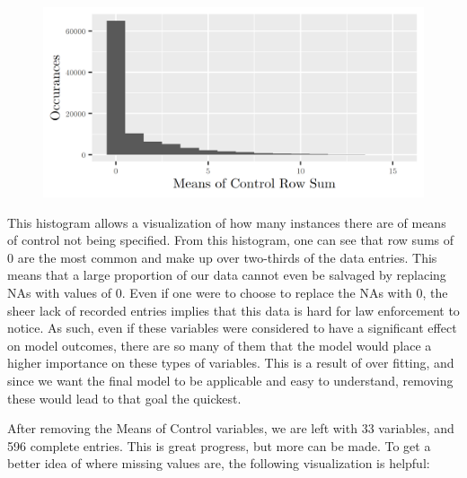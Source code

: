 \documentclass{article} %
\begin{document}
	\begin{figure}[H]
		\includegraphics[width = \textwidth]{MeansOfControlSumHist}
	\end{figure}
	
	This histogram allows a visualization of how many instances there are of means of control not being specified. From this histogram, one can see that row sums of 0 are the most common and make up over two-thirds of the data entries. This means that a large proportion of our data cannot even be salvaged by replacing NAs with values of 0. Even if one were to choose to replace the NAs with 0, the sheer lack of recorded entries implies that this data is hard for law enforcement to notice. As such, even if these variables were considered to have a significant effect on model outcomes, there are so many of them that the model would place a higher importance on these types of variables. This is a result of over fitting, and since we want the final model to be applicable and easy to understand, removing these would lead to that goal the quickest.
	
	After removing the Means of Control variables, we are left with 33 variables, and 596 complete entries. This is great progress, but more can be made. To get a better idea of where missing values are, the following visualization is helpful:
	
\end{document}
